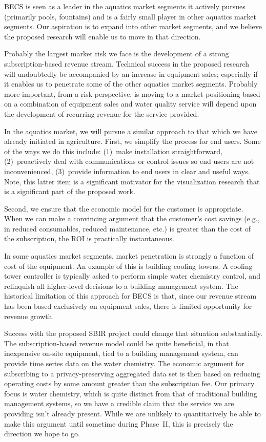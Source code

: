 BECS is seen as a leader in the aquatics market segments it actively pursues
(primarily pools, fountains) and is a fairly small player in other
aquatics market segments.  Our aspiration is to expand into other market
segments, and we believe the proposed research will enable us to move
in that direction.

Probably the largest market risk we face is the development of a strong
subscription-based revenue stream.  Technical success in the proposed
research will undoubtedly be accompanied by an increase in equipment sales;
especially if it enables us to penetrate some of the other aquatics
market segments.  Probably more important, from a risk perspective,
is moving to a
market positioning based on a combination of equipment sales and
water quality service will depend upon the development of recurring
revenue for the service provided.

In the aquatics market, we will pursue a similar approach to that which
we have already initiated in agriculture. First, we simplify the process
for end users. Some of the ways we do this include:
(1)~make installation straightforward,
(2)~proactively deal with communications or control issues so end users are not
inconvenienced,
(3)~provide information to end users in clear and useful ways.
Note, this latter item is a significant motivator for the visualization
research that is a significant part of the proposed work.

Second, we ensure that the economic model for the customer is appropriate.
When we can make a convincing argument that the customer's cost savings
(e.g., in reduced consumables, reduced maintenance, etc.) is greater than
the cost of the subscription, the ROI is practically instantaneous.

In some aquatics market segments, market penetration is strongly a function
of cost of the equipment.  An example of this is building cooling towers.
A cooling tower controller is typically asked to perform simple water
chemistry control, and relinquish all higher-level decisions to a
building management system. The historical limitation of this approach
for BECS is that, since our revenue stream has been based exclusively
on equipment sales, there is limited opportunity for revenue growth.

Success with the proposed SBIR project could change that situation
substantially.  The subscription-based revenue model could be quite
beneficial, in that inexpensive on-site equipment, tied to a building
management system, can provide time series data on the water chemistry.
The economic argument for subscribing to a privacy-preserving aggregated
data set is then based on reducing operating costs by some amount
greater than the subscription fee.
Our primary focus is water chemistry, which is quite distinct from 
that of traditional
building management systems, so we have a credible claim that the service
we are providing isn't already present.
While we are unlikely to quantitatively
be able to make this argument until sometime during Phase~II, this is
precisely the direction we hope to go.


